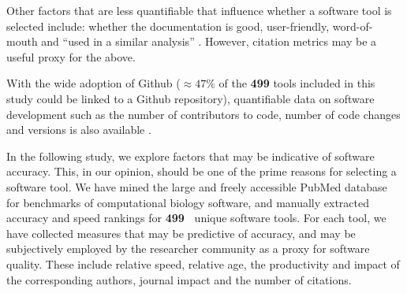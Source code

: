 \documentclass[fleqn,10pt]{SelfArx} %
\def\numTools{499}
\begin{document}
Other factors that are less quantifiable that influence whether a
software tool is selected include: whether the documentation is good,
user-friendly, word-of-mouth and ``used in a similar analysis''
\cite{Loman2015-bw}.
However, citation metrics may be a
useful proxy for the above.

With the wide adoption of Github ($\approx 47\%$ of the
\textbf{{\color{red}\numTools}} tools included in this study could be
linked to a Github repository), quantifiable data on software
development such as the number of contributors to code, number of code
changes and versions is also available
\cite{ray2014large,Dozmorov:2018,mangul2018comprehensive}.

In the following study, we explore factors that may be indicative of
software accuracy. This, in our opinion, should be one of the prime
reasons for selecting a software tool. We have mined the large and
freely accessible PubMed database \cite{Sayers2010-vm} for benchmarks
of computational biology software, and manually extracted accuracy and
speed rankings for \textbf{{\color{red}\numTools~}} unique software tools. For
each tool, we have collected measures that may be predictive
of accuracy, and may be subjectively employed by the researcher
community as a proxy for software quality. These include relative
speed, relative age, the productivity and impact of the corresponding
authors, journal impact and the number of citations.
\end{document}
